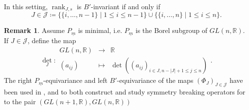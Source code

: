 \documentclass[pdftex]{sigma}
\numberwithin{equation}{section}
\theoremstyle{definition}
\newtheorem{Remark}[Theorem]{Remark}
\newcommand{\rank}{\operatorname{rank}}
\newcommand{\R}{\mathbb{R}}
\theoremstyle{plain}
\theoremstyle{plain}
\theoremstyle{plain}
\theoremstyle{plain}
\begin{document}
In this setting, $\rank_{J,s}$ is $B'$-invariant if and only if
\begin{equation*}
	J \in \mathcal J \coloneq \Big\{\{i,\dots,n-1\} \mid 1 \leqslant i \leqslant n-1\Big\} \cup \Big\{\{i,\dots,n\} \mid 1 \leqslant i \leqslant n\Big\}.
\end{equation*}

\begin{Remark}
	Assume $P_{\underline m}$ is minimal, i.e. $P_{\underline m}$ is the Borel subgroup of $GL(n,\R)$. If $J \in \mathcal J$, define the map
	\begin{equation*}
		{\det}_J : \begin{array}{ccc}
		GL(n,\R) & \to & \R \\
		(a_{ij}) & \mapsto & \det((a_{ij})_{i \in J, n-|J|+1 \leqslant j \leqslant n})
	\end{array}.
	\end{equation*}
	The right $P_{\underline m}$-equivariance and left $B'$-equivariance of the maps $(\Phi_J)_{J \in \mathcal J}$ have been used in \cite{Frahm_2023}, \cite{DitlevsenFrahm} and \cite{DitlevsenLabriet} to both construct and study symmetry breaking operators for to the pair $(GL(n+1,\R),GL(n,\R))$
\end{Remark}
\end{document}
